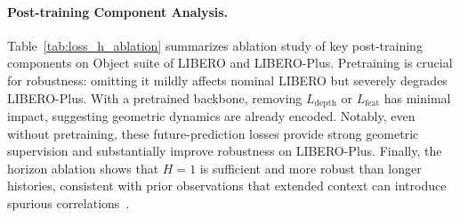 \documentclass{llmxive}
\providecommand{\xmark}{\ding{55}}
\providecommand{\cmark}{\ding{51}}
\begin{document}
\paragraph{Post-training Component Analysis.}
Table~\ref{tab:loss_h_ablation} summarizes ablation study of key post-training components on Object suite of LIBERO and LIBERO-Plus. Pretraining is crucial for robustness: omitting it mildly affects nominal LIBERO but severely degrades LIBERO-Plus. With a pretrained backbone, removing $L_{\text{depth}}$ or $L_{\text{feat}}$ has minimal impact, suggesting geometric dynamics are already encoded.
Notably, even without pretraining, these future-prediction losses provide strong geometric supervision and substantially improve robustness on LIBERO-Plus. Finally, the horizon ablation shows that $H=1$ is sufficient and more robust than longer histories, consistent with prior observations that extended context can introduce spurious correlations~\cite{wen2020fighting,de2019causal}.



\renewcommand{\cmark}{}
\renewcommand{\xmark}{}
\end{document}
